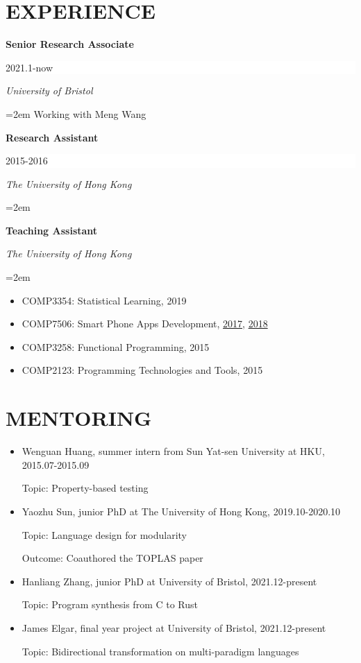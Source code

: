 \documentclass[paper=letter,fontsize=11pt]{scrartcl} %
\newcommand{\sepspace}{\vspace*{1em}}		%
\newcommand{\NewPart}[2]{\section*{\uppercase{#1} #2}}
\newcommand{\EducationEntry}[4]{
		\noindent \textbf{#1} \hfill      %
		\colorbox{White}{%
			\parbox{6em}{%
			\hfill\color{Black}#2}} \par  %
		\noindent \textit{#3} \par        %
		\noindent\hangindent=2em\hangafter=0 \small #4 %
		\normalsize \par}
\begin{document}
\NewPart{Experience}{}
\EducationEntry{Senior Research Associate}{2021.1-now}{University of Bristol}{Working with Meng Wang}
\EducationEntry{Research Assistant}{2015-2016}{The University of Hong Kong}{}
\EducationEntry{Teaching Assistant}{}{The University of Hong Kong}
{\begin{itemize}
\item{COMP3354: Statistical Learning, 2019}
\item{COMP7506: Smart Phone Apps Development, \href{https://msccs.cs.hku.hk/public/courses/2017/COMP7506A}{2017}, \href{https://msccs.cs.hku.hk/public/courses/2018/COMP7506A}{2018}}
\item{COMP3258: Functional Programming, 2015}
\item{COMP2123: Programming Technologies and Tools, 2015}
\end{itemize}}
\sepspace

\NewPart{Mentoring}{}
\begin{itemize}

\item Wenguan Huang, summer intern from Sun Yat-sen University at HKU, 2015.07-2015.09

  Topic: Property-based testing

\item Yaozhu Sun, junior PhD at The University of Hong Kong, 2019.10-2020.10

  Topic: Language design for modularity

  Outcome: Coauthored the TOPLAS paper

\item Hanliang Zhang, junior PhD at University of Bristol, 2021.12-present

  Topic: Program synthesis from C to Rust

\item James Elgar, final year project at University of Bristol, 2021.12-present

  Topic: Bidirectional transformation on multi-paradigm languages
\end{itemize}
\end{document}
